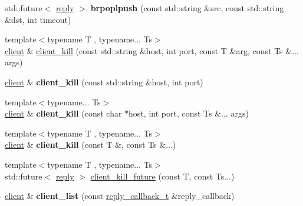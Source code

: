 \begin{DoxyCompactItemize}
\item 
\mbox{\label{classcpp__redis_1_1client_aa30b9303ee0d59b07dd656db2426547e}} 
std\+::future$<$ \hyperlink{classcpp__redis_1_1reply}{reply} $>$ {\bfseries brpoplpush} (const std\+::string \&src, const std\+::string \&dst, int timeout)
\item 
{\footnotesize template$<$typename T , typename... Ts$>$ }\\\hyperlink{classcpp__redis_1_1client}{client} \& \hyperlink{classcpp__redis_1_1client_ae4090830d1710276c33ff5a74eba2e4b}{client\+\_\+kill} (const std\+::string \&host, int port, const T \&arg, const Ts \&... args)
\item 
\mbox{\label{classcpp__redis_1_1client_a3163e1f29d65a5e7b0d4165be154fb96}} 
\hyperlink{classcpp__redis_1_1client}{client} \& {\bfseries client\+\_\+kill} (const std\+::string \&host, int port)
\item 
\mbox{\label{classcpp__redis_1_1client_a38df8e614a5ac9533a1993b7dec7be6b}} 
{\footnotesize template$<$typename... Ts$>$ }\\\hyperlink{classcpp__redis_1_1client}{client} \& {\bfseries client\+\_\+kill} (const char $\ast$host, int port, const Ts \&... args)
\item 
\mbox{\label{classcpp__redis_1_1client_a1e2dd6cdcdb4307ceda0f866fe0a154f}} 
{\footnotesize template$<$typename T , typename... Ts$>$ }\\\hyperlink{classcpp__redis_1_1client}{client} \& {\bfseries client\+\_\+kill} (const T \&, const Ts \&...)
\item 
{\footnotesize template$<$typename T , typename... Ts$>$ }\\std\+::future$<$ \hyperlink{classcpp__redis_1_1reply}{reply} $>$ \hyperlink{classcpp__redis_1_1client_ae6f09b6c022c910b79fb90a47291f511}{client\+\_\+kill\+\_\+future} (const T, const Ts...)
\item 
\mbox{\label{classcpp__redis_1_1client_a9c2e307ab54f42ce50bdd42e1c6a363b}} 
\hyperlink{classcpp__redis_1_1client}{client} \& {\bfseries client\+\_\+list} (const \hyperlink{classcpp__redis_1_1client_a061a1140d36d2eaeda82b09a0bb3f9f2}{reply\+\_\+callback\+\_\+t} \&reply\+\_\+callback)
\item 

\end{DoxyCompactItemize}
